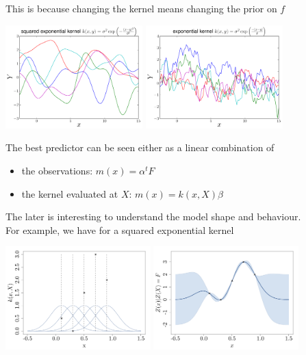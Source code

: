\documentclass{beamer}
\begin{document}
\begin{frame}{}
This is because changing the kernel means changing the prior on $f$\\ 
\begin{center}
\includegraphics[height=4cm]{figures/R/Fig2-sim-rbf} 
\includegraphics[height=4cm]{figures/R/Fig2-sim-exp}
\end{center}
\end{frame}

\begin{frame}{}
The best predictor can be seen either as a linear combination of
\begin{itemize}
	\item the observations: $m(x)=\alpha^t F$
	\item the kernel evaluated at $X$: $m(x)=k(x,X) \beta$
\end{itemize} 
The later is interesting to understand the model shape and behaviour. \\
\vspace{5mm}
For example, we have for a squared exponential kernel
\begin{center}
\includegraphics[height=4cm]{figures/R/ch34_basisfuncGauss}  
\includegraphics[height=4cm]{figures/R/ch34_GPRbasisfuncGauss} 
\end{center}
\end{frame}
\end{document}
